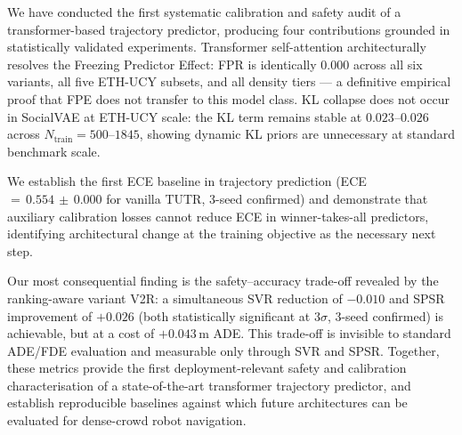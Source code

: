 \documentclass{article}
\begin{document}
We have conducted the first systematic calibration and safety audit of a
transformer-based trajectory predictor, producing four contributions grounded
in statistically validated experiments. Transformer self-attention
architecturally resolves the Freezing Predictor Effect: FPR is identically
\(0.000\) across all six variants, all five ETH-UCY subsets, and all density
tiers --- a definitive empirical proof that FPE does not transfer to this model
class. KL collapse does not occur in SocialVAE at ETH-UCY scale: the KL term
remains stable at \(0.023\)--\(0.026\) across \(N_{\text{train}}=500\)--\(1845\),
showing dynamic KL priors are unnecessary at standard benchmark scale.

We establish the first ECE baseline in trajectory prediction
(ECE\,\(=\,0.554\,\pm\,0.000\) for vanilla TUTR, 3-seed confirmed) and
demonstrate that auxiliary calibration losses cannot reduce ECE in
winner-takes-all predictors, identifying architectural change at the training
objective as the necessary next step.

Our most consequential finding is the safety--accuracy trade-off revealed by
the ranking-aware variant V2R: a simultaneous SVR reduction of \(-0.010\) and
SPSR improvement of \(+0.026\) (both statistically significant at \(3\sigma\),
3-seed confirmed) is achievable, but at a cost of \(+0.043\)\,m ADE. This
trade-off is invisible to standard ADE/FDE evaluation and measurable only
through SVR and SPSR. Together, these metrics provide the first
deployment-relevant safety and calibration characterisation of a
state-of-the-art transformer trajectory predictor, and establish reproducible
baselines against which future architectures can be evaluated for dense-crowd
robot navigation.



\end{document}
